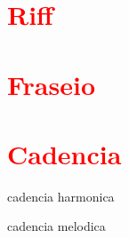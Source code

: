 \section{\textcolor{red}{Riff}}

\section{\textcolor{red}{Fraseio}}


\section{\textcolor{red}{Cadencia}}

\cite[pp. 111]{holst1998abc}



cadencia harmonica \cite[pp. 67]{melcior1859diccionario} \cite[pp. 60]{pedrell2009diccionario}

cadencia melodica \cite[pp. 66]{melcior1859diccionario} \cite[pp. 60]{pedrell2009diccionario}


